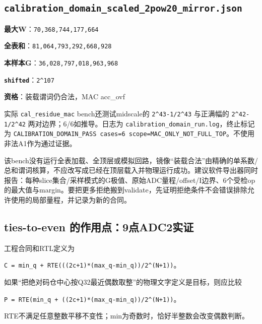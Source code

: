 \documentclass[UTF8,fontset=fandol,10pt,a4paper,openany]{ctexrep}
\newcommand{\code}[1]{\nolinkurl{#1}}
\begin{document}
\subsection*{\code{calibration_domain_scaled_2pow20_mirror.json}}
\noindent\textbf{最大W}：\code{70,368,744,177,664}\par
\noindent\textbf{全表和}：\code{81,064,793,292,668,928}\par
\noindent\textbf{本样本G}：\code{36,028,797,018,963,968}\par
\noindent\textbf{\code{shifted}}：\code{2^107}\par
\noindent\textbf{资格}：装载谓词仍合法，MAC acc\_ovf\par


实际 \code{cal_residue_mac} bench还测试midscale的 \code{2^43-1/2^43} 与正满幅的 \code{2^42-1/2^42} 两对边界；6/6如推导。日志为 \code{calibration_domain_run.log}，终止标记为 \code{CALIBRATION_DOMAIN_PASS cases=6 scope=MAC_ONLY_NOT_FULL_TOP}。不使用非法A1作为通过证据。


该bench没有运行全表加载、全顶层或模拟回路，镜像“装载合法”由精确的单系数/总和谓词核算，不应改写成已经在顶层载入并物理运行成功。建议软件导出器同时报告：每种slice集合/采样模式的G极值、原始ADC量程/offset/I边界、6个受检op的最大值与margin。要把更多拒绝搬到validate，先证明拒绝条件不会错误排除允许使用的局部量程，并记录为新的合同。


\subsection{ties-to-even 的作用点：9点ADC2实证}


工程合同和RTL定义为


\code{C = min_q + RTE(((2c+1)*(max_q-min_q))/2^(N+1))}。


如果“把绝对码仓中心按Q32最近偶数取整”的物理文字定义是目标，则应比较


\code{P = RTE(min_q + ((2c+1)*(max_q-min_q))/2^(N+1))}。


RTE不满足任意整数平移不变性；min为奇数时，恰好半整数会改变偶数判断。
\end{document}

